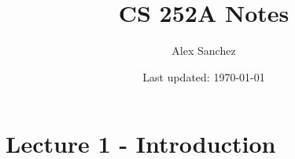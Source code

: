 \documentclass{book}
\title{CS 252A Notes}
\author{Alex Sanchez}
\date{Last updated: \today}
\begin{document}
\maketitle

\chapter{Lecture 1 - Introduction}

\end{document}

